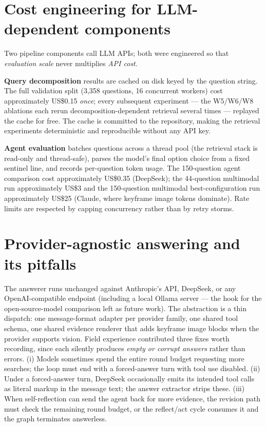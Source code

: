 \section{Cost engineering for LLM-dependent
components}

Two pipeline components call LLM APIs; both were engineered so that
\emph{evaluation scale} never multiplies \emph{API cost}.

\textbf{Query decomposition} results are cached on disk keyed by the
question string. The full validation split (3,358 questions, 16
concurrent workers) cost approximately US\$0.15 \emph{once}; every
subsequent experiment --- the W5/W6/W8 ablations each rerun
decomposition-dependent retrieval several times --- replayed the cache
for free. The cache is committed to the repository, making the retrieval
experiments deterministic and reproducible without any API key.

\textbf{Agent evaluation} batches questions across a thread pool (the
retrieval stack is read-only and thread-safe), parses the model's final
option choice from a fixed sentinel line, and records per-question token
usage. The 150-question agent comparison cost approximately US\$0.35
(DeepSeek); the 44-question multimodal run approximately US\$3 and the
150-question multimodal best-configuration run approximately US\$25
(Claude, where keyframe image tokens dominate). Rate limits are
respected by capping concurrency rather than by retry storms.

\section{Provider-agnostic answering and its
pitfalls}

The answerer runs unchanged against Anthropic's API, DeepSeek, or any
OpenAI-compatible endpoint (including a local Ollama server --- the hook
for the open-source-model comparison left as future work). The
abstraction is a thin dispatch: one message-format adapter per provider
family, one shared tool schema, one shared evidence renderer that adds
keyframe image blocks when the provider supports vision. Field
experience contributed three fixes worth recording, since each silently
produces \emph{empty or corrupt answers} rather than errors. (i) Models
sometimes spend the entire round budget requesting more searches; the
loop must end with a forced-answer turn with tool use disabled. (ii)
Under a forced-answer turn, DeepSeek occasionally emits its intended
tool calls as literal markup in the message text; the answer extractor
strips these. (iii) When self-reflection can send the agent back for
more evidence, the revision path must check the remaining round budget,
or the reflect/act cycle consumes it and the graph terminates
answerless.

